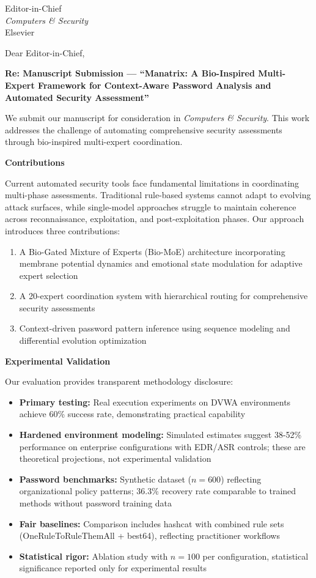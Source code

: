 \documentclass[11pt]{letter}
\begin{document}
\begin{letter}{Editor-in-Chief\\
\textit{Computers \& Security}\\
Elsevier}

\opening{Dear Editor-in-Chief,}

\textbf{Re: Manuscript Submission --- ``Manatrix: A Bio-Inspired Multi-Expert Framework for Context-Aware Password Analysis and Automated Security Assessment''}

We submit our manuscript for consideration in \textit{Computers \& Security}. This work addresses the challenge of automating comprehensive security assessments through bio-inspired multi-expert coordination.

\textbf{Contributions}

Current automated security tools face fundamental limitations in coordinating multi-phase assessments. Traditional rule-based systems cannot adapt to evolving attack surfaces, while single-model approaches struggle to maintain coherence across reconnaissance, exploitation, and post-exploitation phases. Our approach introduces three contributions:

\begin{enumerate}
    \item A Bio-Gated Mixture of Experts (Bio-MoE) architecture incorporating membrane potential dynamics and emotional state modulation for adaptive expert selection
    \item A 20-expert coordination system with hierarchical routing for comprehensive security assessments
    \item Context-driven password pattern inference using sequence modeling and differential evolution optimization
\end{enumerate}

\textbf{Experimental Validation}

Our evaluation provides transparent methodology disclosure:

\begin{itemize}
    \item \textbf{Primary testing:} Real execution experiments on DVWA environments achieve 60\% success rate, demonstrating practical capability
    \item \textbf{Hardened environment modeling:} Simulated estimates suggest 38-52\% performance on enterprise configurations with EDR/ASR controls; these are theoretical projections, not experimental validation
    \item \textbf{Password benchmarks:} Synthetic dataset ($n=600$) reflecting organizational policy patterns; 36.3\% recovery rate comparable to trained methods without password training data
    \item \textbf{Fair baselines:} Comparison includes hashcat with combined rule sets (OneRuleToRuleThemAll + best64), reflecting practitioner workflows
    \item \textbf{Statistical rigor:} Ablation study with $n=100$ per configuration, statistical significance reported only for experimental results
\end{itemize}


\end{letter}
\end{document}
